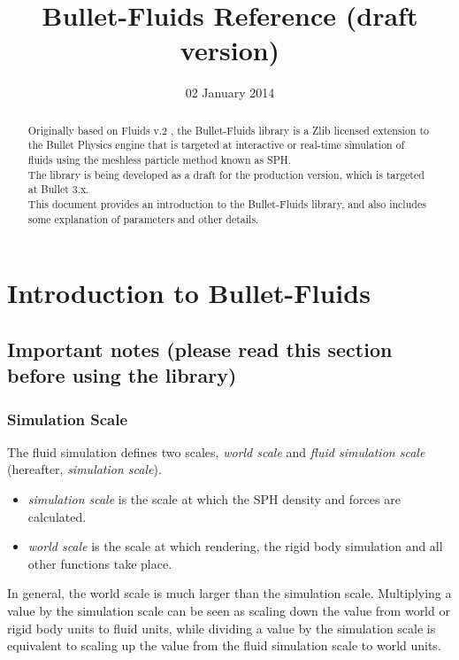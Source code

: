 \documentclass[]{article}
\title{Bullet-Fluids Reference (draft version)}
\author{}
\date{02 January 2014}
\begin{document}
\maketitle

\begin{abstract}
	Originally based on Fluids v.2 \cite{RH:2008}, the Bullet-Fluids library is a Zlib licensed extension to the Bullet
	Physics engine \cite{EC:2012} that is targeted at interactive or real-time simulation of fluids using the meshless 
	particle method known as SPH.\\
	
	The library is being developed as a draft for the production version, which is targeted at Bullet 3.x.\\
	
	This document provides an introduction to the Bullet-Fluids library, and also includes some explanation of 
	parameters and other details.
\end{abstract}

\tableofcontents

\pagebreak
\section{Introduction to Bullet-Fluids}
	\label{s_bulletFluidsIntro}
	
	\subsection{Important notes (please read this section before using the library)}
		\subsubsection{Simulation Scale}
			\label{s_simulationScale}
			The fluid simulation defines two scales, \textit{world scale} and \textit{fluid simulation scale} 
			(hereafter, \textit{simulation scale}).
			\begin{itemize}
				\item \textit{simulation scale} is the scale at which the SPH density and forces are calculated.
				\item \textit{world scale} is the scale at which rendering, the rigid body simulation and all other functions take place.
			\end{itemize}
			
			In general, the world scale is much larger than the simulation scale. Multiplying a value by the simulation 
			scale can be seen as scaling down the value from world or rigid body units to fluid units, while dividing a 
			value by the simulation scale is equivalent to scaling up the value from the fluid simulation scale to world units.
			
\end{document}

